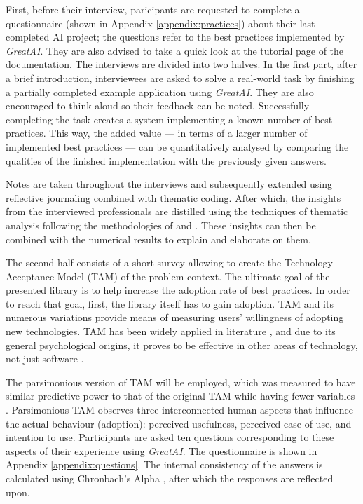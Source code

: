First, before their interview, paricipants are requested to complete a questionnaire (shown in Appendix \ref{appendix:practices}) about their last completed AI project; the questions refer to the best practices implemented by \textit{GreatAI}. They are also advised to take a quick look at the tutorial page of the documentation. The interviews are divided into two halves. In the first part, after a brief introduction, interviewees are asked to solve a real-world task by finishing a partially completed example application using \textit{GreatAI}. They are also encouraged to think aloud so their feedback can be noted. Successfully completing the task creates a system implementing a known number of best practices. This way, the added value --- in terms of a larger number of implemented best practices --- can be quantitatively analysed by comparing the qualities of the finished implementation with the previously given answers. 

Notes are taken throughout the interviews and subsequently extended using reflective journaling \cite{halcomb2006verbatim} combined with thematic coding. After which, the insights from the interviewed professionals are distilled using the techniques of thematic analysis \cite{fereday2006demonstrating} following the methodologies of \cite{cruz2019catalog} and \cite{haakman2021ai}. These insights can then be combined with the numerical results to explain and elaborate on them. 

The second half consists of a short survey allowing to create the Technology Acceptance Model (TAM) \cite{davis1989perceived} of the problem context. The ultimate goal of the presented library is to help increase the adoption rate of best practices. In order to reach that goal, first, the library itself has to gain adoption. TAM and its numerous variations provide means of measuring users' willingness of adopting new technologies. TAM has been widely applied in literature \cite{marangunic2015technology}, and due to its general psychological origins, it proves to be effective in other areas of technology, not just software \cite{riemenschneider2002explaining}. 

The parsimonious version of TAM will be employed, which was measured to have similar predictive power to that of the original TAM while having fewer variables \cite{wu2011user}. Parsimonious TAM observes three interconnected human aspects that influence the actual behaviour (adoption): perceived usefulness, perceived ease of use, and intention to use. Participants are asked ten questions corresponding to these aspects of their experience using \textit{GreatAI}. The questionnaire is shown in Appendix \ref{appendix:questions}. The internal consistency of the answers is calculated using Chronbach's Alpha \cite{bland1997statistics}, after which the responses are reflected upon.
